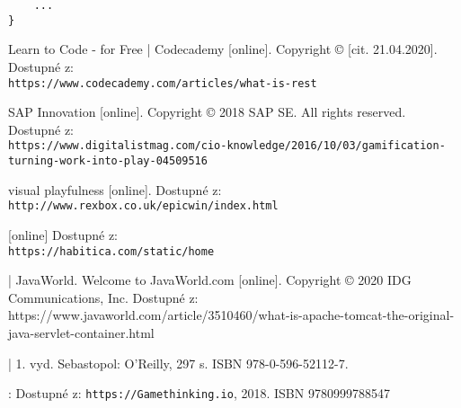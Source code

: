 \documentclass[12pt]{article}
\begin{document}
{\begin{lstlisting}
    ...
}
\end{lstlisting}




\begin{literatura}

{
 Learn to Code - for Free | Codecademy [online]. 
Copyright © [cit. 21.04.2020]. 
Dostupné z:
\\
\texttt{https://www.codecademy.com/articles/what-is-rest}
}

{
SAP Innovation [online]. Copyright © 2018 SAP SE. All rights reserved.
Dostupné z:
\\
\texttt{https://www.digitalistmag.com/cio-knowledge/2016/10/03/gamification-turning-work-into-play-04509516}
}

{
 visual playfulness [online].
Dostupné z:
\texttt{http://www.rexbox.co.uk/epicwin/index.html}
}

{
 [online]
Dostupné z: 
\\
\texttt{https://habitica.com/static/home}
}

{
 | JavaWorld. 
Welcome to JavaWorld.com [online]. Copyright © 2020 IDG Communications, Inc. 
Dostupné z: 
\\
https://www.javaworld.com/article/3510460/what-is-apache-tomcat-the-original-java-servlet-container.html
}

{
 | 1. vyd. Sebastopol: O'Reilly, 297 s. ISBN 978-0-596-52112-7.
}

{
:
Dostupné z: \texttt{https://Gamethinking.io}, 2018. ISBN 9780999788547
}



\end{literatura}}
\end{document}
